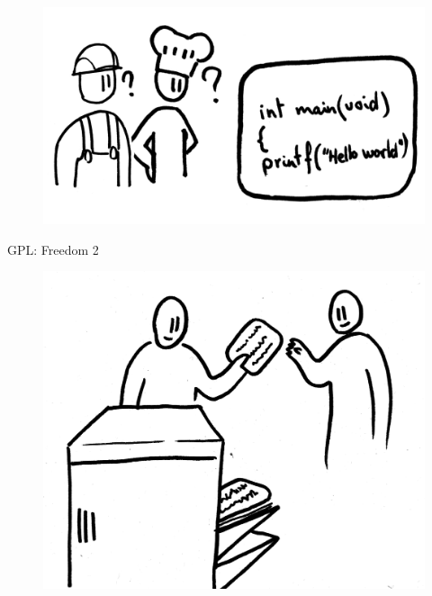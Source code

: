 \documentclass[notes,usenames,dvipsnames]{beamer}       %
\begin{document}
\begin{frame}
  \begin{figure}
    \centering
    \includegraphics[scale=0.3]{img/not-programmer}
  \end{figure}
\end{frame}

\begin{frame}{GPL: Freedom 2}
  \begin{figure}
    \centering
    \includegraphics[scale=0.3]{img/fr-redistribute.png}
  \end{figure}
\end{frame}
\end{document}
